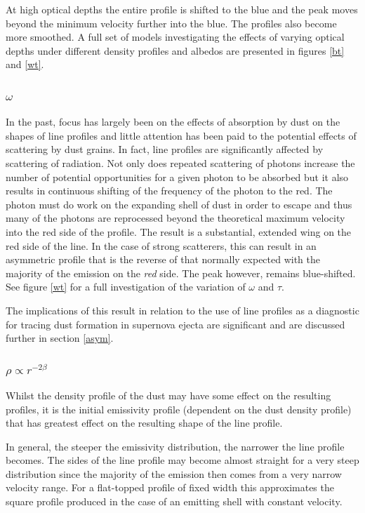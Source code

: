 \documentclass[useAMS,usenatbib,usegraphicx]{mnras}
\begin{document}
At high optical depths the entire profile is shifted to the blue and the 
peak moves beyond the minimum velocity further into the blue.  The 
profiles also become more smoothed.  A full set of models investigating 
the effects of varying optical depths under different density profiles and 
albedos are presented in figures \ref{bt} and \ref{wt}.

\subsubsection{$\omega$}
\label{omega}

In the past, focus has largely been on the effects of absorption by dust 
on the shapes of line profiles and little attention has been paid to the 
potential effects of scattering by dust grains.  In fact, line profiles 
are significantly affected by scattering of radiation.  Not only does 
repeated scattering of photons increase the number of potential 
opportunities for a given photon to be absorbed but it also results in 
continuous shifting of the frequency of the photon to the red.  The photon 
must do work on the expanding shell of dust in order to escape and thus 
many of the photons are reprocessed beyond the theoretical maximum 
velocity into the red side of the profile.  The result is a substantial, 
extended wing on the red side of the line.  In the case of strong 
scatterers, this can result in an asymmetric profile that is the reverse 
of that normally expected with the majority of the emission on the 
\textit{red} side.  The peak however, remains blue-shifted.  See figure 
\ref{wt} for a full investigation of the variation of $\omega$ and $\tau$.

The implications of this result in relation to the use of line profiles as 
a diagnostic for tracing dust formation in supernova ejecta are 
significant and are discussed further in section \ref{asym}.


\subsubsection{$\rho \propto r^{-2\beta}$}
\label{beta}

Whilst the density profile of the dust may have some effect on the 
resulting profiles, it is the initial emissivity profile (dependent on the 
dust density profile) that has greatest effect on the resulting shape of 
the line profile.

In general, the steeper the emissivity distribution, the narrower the line 
profile becomes.  The sides of the line profile may become almost straight 
for a very steep distribution since the majority of the emission then 
comes from a very narrow velocity range.  For a flat-topped profile of 
fixed width this approximates the square profile produced in the case of 
an emitting shell with constant velocity.
\end{document}
